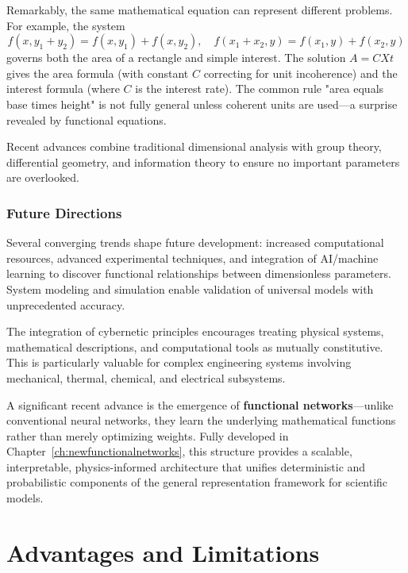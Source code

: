 Remarkably, the same mathematical equation can represent different problems. For example, the system
\[
f(x,y_1+y_2)=f(x,y_1)+f(x,y_2),\quad f(x_1+x_2,y)=f(x_1,y)+f(x_2,y)
\]
governs both the area of a rectangle and simple interest. The solution \(A = C X t\) gives the area formula (with constant \(C\) correcting for unit incoherence) and the interest formula (where \(C\) is the interest rate). The common rule "area equals base times height" is not fully general unless coherent units are used—a surprise revealed by functional equations.

Recent advances combine traditional dimensional analysis with group theory, differential geometry, and information theory to ensure no important parameters are overlooked.

\subsubsection*{Future Directions}

Several converging trends shape future development: increased computational resources, advanced experimental techniques, and integration of AI/machine learning to discover functional relationships between dimensionless parameters. System modeling and simulation enable validation of universal models with unprecedented accuracy.

The integration of cybernetic principles encourages treating physical systems, mathematical descriptions, and computational tools as mutually constitutive. This is particularly valuable for complex engineering systems involving mechanical, thermal, chemical, and electrical subsystems.

A significant recent advance is the emergence of \textbf{functional networks}—unlike conventional neural networks, they learn the underlying mathematical functions rather than merely optimizing weights. Fully developed in Chapter~\ref{ch:newfunctionalnetworks}, this structure provides a scalable, interpretable, physics-informed architecture that unifies deterministic and probabilistic components of the general representation framework for scientific models.

\section{Advantages and Limitations}\label{ch02:AdvantagesLimitations}

